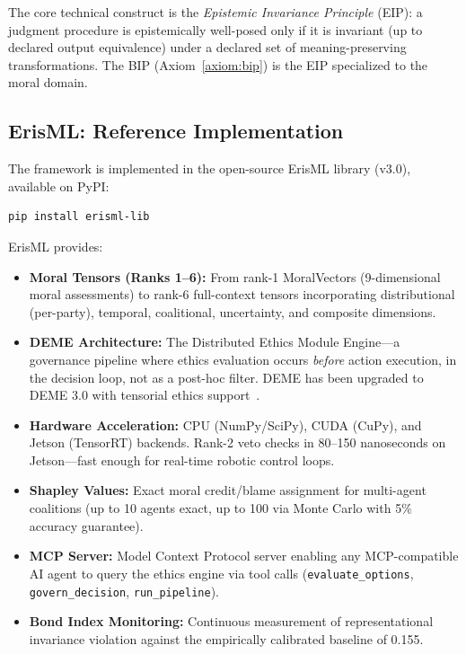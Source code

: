 \documentclass[12pt,letterpaper]{article}
\theoremstyle{definition}
\theoremstyle{remark}
\begin{document}
The core technical construct is the \emph{Epistemic Invariance Principle} (EIP): a judgment procedure is epistemically well-posed only if it is invariant (up to declared output equivalence) under a declared set of meaning-preserving transformations. The BIP (Axiom~\ref{axiom:bip}) is the EIP specialized to the moral domain.

\subsection{ErisML: Reference Implementation}

The framework is implemented in the open-source ErisML library (v3.0), available on PyPI:

\begin{verbatim}
pip install erisml-lib
\end{verbatim}

ErisML provides:

\begin{itemize}
    \item \textbf{Moral Tensors (Ranks 1--6):} From rank-1 MoralVectors (9-dimensional moral assessments) to rank-6 full-context tensors incorporating distributional (per-party), temporal, coalitional, uncertainty, and composite dimensions.
    \item \textbf{DEME Architecture:} The Distributed Ethics Module Engine---a governance pipeline where ethics evaluation occurs \emph{before} action execution, in the decision loop, not as a post-hoc filter. DEME has been upgraded to DEME 3.0 with tensorial ethics support~\cite{bond2026erisml}.
    \item \textbf{Hardware Acceleration:} CPU (NumPy/SciPy), CUDA (CuPy), and Jetson (TensorRT) backends. Rank-2 veto checks in 80--150 nanoseconds on Jetson---fast enough for real-time robotic control loops.
    \item \textbf{Shapley Values:} Exact moral credit/blame assignment for multi-agent coalitions (up to 10 agents exact, up to 100 via Monte Carlo with 5\% accuracy guarantee).
    \item \textbf{MCP Server:} Model Context Protocol server enabling any MCP-compatible AI agent to query the ethics engine via tool calls (\texttt{evaluate\_options}, \texttt{govern\_decision}, \texttt{run\_pipeline}).
    \item \textbf{Bond Index Monitoring:} Continuous measurement of representational invariance violation against the empirically calibrated baseline of 0.155.
\end{itemize}
\end{document}
